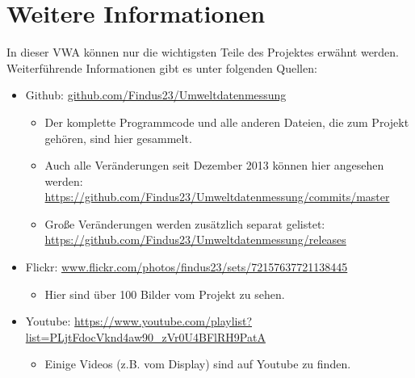 \chapter{Weitere Informationen}
\label{anhang:weitere_informationen}
In dieser VWA können nur die wichtigsten Teile des Projektes erwähnt werden.
Weiterführende Informationen gibt es unter folgenden Quellen:
\begin{itemize}
\item \gls{Github}: \href{https://github.com/Findus23/Umweltdatenmessung}{github.com/Findus23/Umweltdatenmessung}
	\begin{itemize}
	\item Der komplette Programmcode und alle anderen Dateien, die zum Projekt gehören, sind hier gesammelt.
	\item Auch alle Veränderungen seit Dezember 2013 können hier angesehen werden:  \url{https://github.com/Findus23/Umweltdatenmessung/commits/master}
	\item Große Veränderungen werden zusätzlich separat gelistet: \url{https://github.com/Findus23/Umweltdatenmessung/releases}
	\end{itemize}
\item \gls{Flickr}: \href{https://www.flickr.com/photos/findus23/sets/72157637721138445/}{www.flickr.com/photos/findus23/sets/72157637721138445}
	\begin{itemize}
	\item Hier sind über 100 Bilder vom Projekt zu sehen.
	\end{itemize}
\item Youtube: \url{https://www.youtube.com/playlist?list=PLjtFdocVknd4aw90_zVr0U4BFlRH9PatA}
	\begin{itemize}
	\item Einige Videos (z.B. vom Display) sind auf Youtube zu finden.
	\end{itemize}
\end{itemize}

